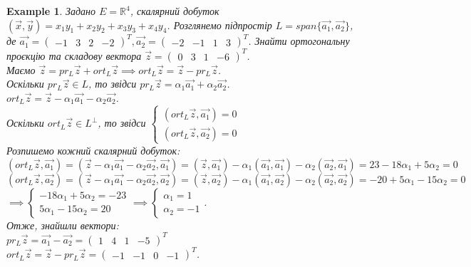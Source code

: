 \documentclass[a4paper, 10pt]{article}
\theoremstyle{theoremdd}
\theoremstyle{theoremdd}
\theoremstyle{theoremdd}
\theoremstyle{theoremdd}
\newtheorem{example}[theorem]{Example}
\theoremstyle{theoremdd}
\theoremstyle{theoremdd}
\theoremstyle{theoremdd}
\theoremstyle{theoremdd}
\begin{document}
\begin{example}
Задано $E = \mathbb{R}^4$, скалярний добуток $(\vec{x},\vec{y}) = x_1y_1+x_2y_2+x_3y_3+x_4y_4$. Розглянемо підпростір $L = span\{ \vec{a_1}, \vec{a_2} \}$, де $\vec{a_1} = \begin{pmatrix}
-1 & 3 & 2 & -2
\end{pmatrix}^T, \vec{a_2} = \begin{pmatrix}
-2 & -1 & 1 & 3
\end{pmatrix}^T$. Знайти ортогональну проєкцію та складову вектора $\vec{z} = \begin{pmatrix}
0 & 3 & 1 & -6
\end{pmatrix}^T$.\\
Маємо $\vec{z} = pr_L \vec{z} + ort_L \vec{z} \implies ort_L \vec{z} = \vec{z} - pr_L \vec{z}$.\\
Оскільки $pr_L \vec{z} \in L$, то звідси $pr_L \vec{z} = \alpha_1 \vec{a_1} + \alpha_2 \vec{a_2}$.\\
$ort_L \vec{z} = \vec{z} - \alpha_1 \vec{a_1} - \alpha_2 \vec{a_2}$.\\
Оскільки $ort_L \vec{z} \in L^\perp$, то звідси $\begin{cases} (ort_L \vec{z}, \vec{a_1}) = 0 \\ (ort_L \vec{z}, \vec{a_2}) = 0 \end{cases}$\\
Розпишемо кожний скалярний добуток:\\
$(ort_L \vec{z}, \vec{a_1}) = (\vec{z} - \alpha_1 \vec{a_1} - \alpha_2 \vec{a_2}, \vec{a_1}) = (\vec{z}, \vec{a_1}) - \alpha_1 (\vec{a_1},\vec{a_1}) - \alpha_2 (\vec{a_2}, \vec{a_1}) = 23 - 18 \alpha_1 +5\alpha_2 = 0$\\
$(ort_L \vec{z}, \vec{a_2}) = (\vec{z} - \alpha_1 \vec{a_1} - \alpha_2 \vec{a_2}, \vec{a_2}) = (\vec{z}, \vec{a_2}) - \alpha_1 (\vec{a_1},\vec{a_2}) - \alpha_2 (\vec{a_2}, \vec{a_2}) = -20 +5 \alpha_1 - 15 \alpha_2 = 0$\\
$\implies \begin{cases} -18\alpha_1 + 5\alpha_2 = -23 \\ 5\alpha_1-15\alpha_2 = 20  \end{cases} \implies \begin{cases} \alpha_1 = 1 \\ \alpha_2 = -1 \end{cases}$.\\
Отже, знайшли вектори: \\
$pr_L \vec{z} = \vec{a_1} - \vec{a_2} = \begin{pmatrix}
1 & 4 & 1 & -5
\end{pmatrix}^T$\\
$ort_L \vec{z} = \vec{z} - pr_L \vec{z} = \begin{pmatrix}
-1 & -1 & 0 & -1
\end{pmatrix}^T$.
\end{example}
\end{document}
